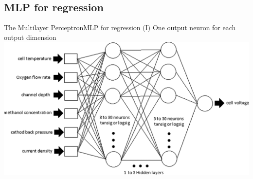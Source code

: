 \documentclass[10pt,compress]{beamer} %
\begin{document}






\subsection{MLP for regression}

\begin{frame}{The Multilayer Perceptron}{MLP for regression (I)}
	One output neuron for each output dimension\\
	\centering\includegraphics[width=0.9\linewidth]{figs/control.png}
\end{frame}
\end{document}
